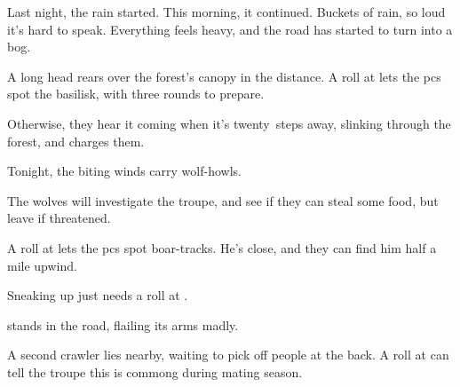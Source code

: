 \ifcase\value{cycle}



\begin{boxtext}
  Last night, the rain started.
  This morning, it continued.
  Buckets of rain, so loud it's hard to speak.
  Everything feels heavy, and the road has started to turn into a bog.
\end{boxtext}

A long head rears over the forest's canopy in the distance.
A  roll at \tn[10] lets the \glspl{pc} spot the \gls{basilisk}, with three \glspl{round} to prepare.

Otherwise, they hear it coming when it's twenty~\glspl{step} away, slinking through the forest, and charges them.

\basilisk

\or%


\begin{boxtext}
  Tonight, the biting winds carry wolf-howls.
\end{boxtext}

The wolves will investigate the troupe, and see if they can steal some food, but leave if threatened.

\wolf

\or%


A  roll at \tn[10] lets the \glspl{pc} spot boar-tracks.
He's close, and they can find him half a mile upwind.

\boar

Sneaking up just needs a  roll at
\tn.

\or%


\begin{boxtext}
   stands in the road, flailing its arms madly.
\end{boxtext}

A second \gls{crawler} lies nearby, waiting to pick off people at the back.
A  roll at \tn[10] can tell the troupe this is commong during mating season.

\chitincrawler

\chitincrawler

\or%


